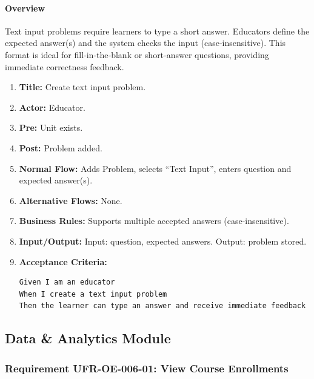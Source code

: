\paragraph{Overview}
Text input problems require learners to type a short answer. Educators define the expected answer(s) and the system checks the input (case‑insensitive). This format is ideal for fill‑in‑the‑blank or short‑answer questions, providing immediate correctness feedback.
\begin{enumerate}[label=\textbf{\arabic*.}]
\item \textbf{Title:} Create text input problem.
\item \textbf{Actor:} Educator.
\item \textbf{Pre:} Unit exists.
\item \textbf{Post:} Problem added.
\item \textbf{Normal Flow:} Adds Problem, selects “Text Input”, enters question and expected answer(s).
\item \textbf{Alternative Flows:} None.
\item \textbf{Business Rules:} Supports multiple accepted answers (case-insensitive).
\item \textbf{Input/Output:} Input: question, expected answers. Output: problem stored.
\item \textbf{Acceptance Criteria:}
    \begin{verbatim}
Given I am an educator
When I create a text input problem
Then the learner can type an answer and receive immediate feedback
    \end{verbatim}
\end{enumerate}

\subsection{Data \& Analytics Module}
\subsubsection{Requirement UFR-OE-006-01: View Course Enrollments}
